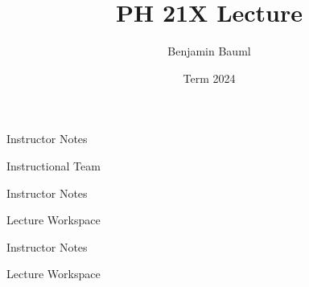 \documentclass[]{article}
\title{PH 21X Lecture \Lec}
\author{Benjamin Bauml}
\date{Term 2024}
\begin{document}
\begin{TeacherMargin}
Instructor Notes
\end{TeacherMargin}
\begin{PresentSpace}
Instructional Team
\end{PresentSpace}
\newpage
\begin{TeacherMargin}
Instructor Notes
\end{TeacherMargin}
\begin{PresentSpace}
Lecture Workspace
\end{PresentSpace}
\newpage
\begin{TeacherMargin}
Instructor Notes
\end{TeacherMargin}
\begin{PresentSpace}
Lecture Workspace
\end{PresentSpace}
\end{document}
